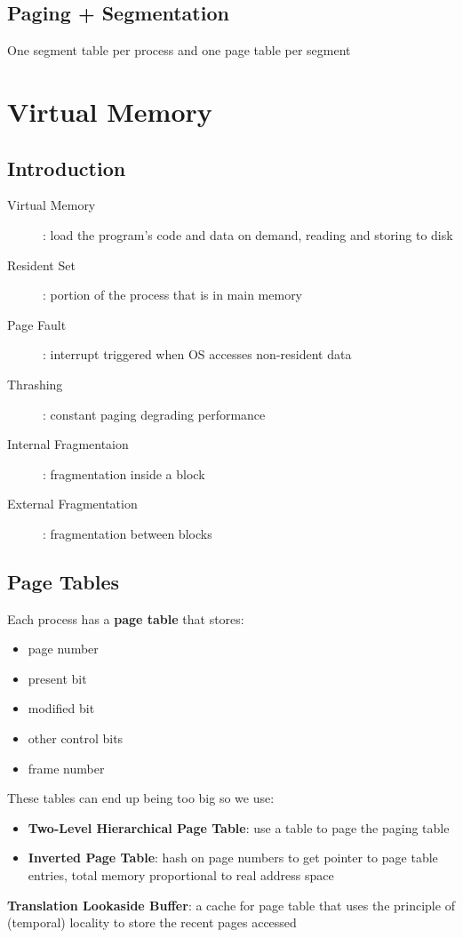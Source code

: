 \documentclass[]{article}
\theoremstyle{definition}
\begin{document}
	\subsection{Paging + Segmentation}
	One segment table per process and one page table per segment
	
	\section{Virtual Memory}

	\subsection{Introduction}
	\begin{description}
		\item[Virtual Memory]: load the program's code and data on demand, reading and storing to disk
		\item[Resident Set]: portion of the process that is in main memory
		\item[Page Fault]: interrupt triggered when OS accesses non-resident data
		\item[Thrashing]: constant paging degrading performance
		\item[Internal Fragmentaion]: fragmentation inside a block
		\item[External Fragmentation]: fragmentation between blocks
	\end{description}

	\subsection{Page Tables}
	Each process has a \textbf{page table} that stores:
	\begin{itemize}
		\item page number
		\item present bit 
		\item modified bit
		\item other control bits
		\item frame number
	\end{itemize}
	These tables can end up being too big so we use:
	\begin{itemize}
		\item \textbf{Two-Level Hierarchical Page Table}: use a table to page the paging table
		\item \textbf{Inverted Page Table}: hash on page numbers to get pointer to page table entries,
			total memory proportional to real address space
	\end{itemize}
	\textbf{Translation Lookaside Buffer}: a cache for page table that uses the principle of (temporal) locality
	to store the recent pages accessed
\end{document}
